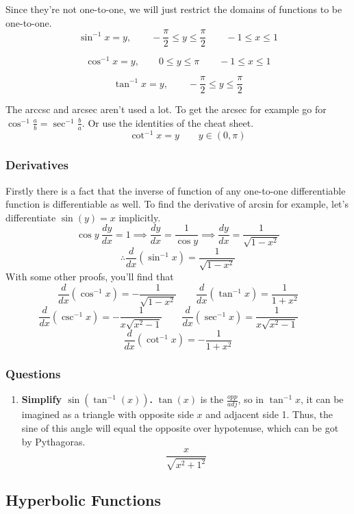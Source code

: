 \documentclass{article}
\begin{document}
Since they're not one-to-one, we will just restrict the domains of functions to be one-to-one.
\[
	\sin^{-1}x = y, \qquad - \frac{\pi}{2} \leq y \leq \frac{\pi}{2} \qquad -1 \leq x \leq 1
\]

\[
	\cos^{-1}x = y, \qquad  0 \leq y \leq \pi  \qquad -1 \leq x \leq 1
\]

\[
	\tan^{-1}x = y, \qquad - \frac{\pi}{2} \leq y \leq \frac{\pi}{2}
\]


The arccsc and arcsec aren't used a lot. To get the arcsec for example go for $\cos^{-1}\frac{a}{b} = \sec^{-1}{ \frac{b}{a} }$.
Or use the identities of the cheat sheet.
\[
	\qquad  \cot^{-1}x = y \qquad y \in (0,\pi) 
\]

\newpage

\subsubsection{Derivatives}
Firstly there is a fact that the inverse of function of any one-to-one differentiable function is differentiable as well.
To find the derivative of arcsin for example, let's differentiate $\sin(y)=x$ implicitly. \[
	\cos{y} \ \frac{dy}{dx} = 1 \implies \frac{dy}{dx} = \frac{1}{\cos{y}} \implies \frac{dy}{dx} = \frac{1}{\sqrt{1-x^2}}
\]
\[
	\therefore \frac{d}{dx}(\sin^{-1}x) = \frac{1}{\sqrt{1-x^2}}
\]
With some other proofs, you'll find that
\[
	\frac{d}{dx}(\cos^{-1}x) = - \frac{1}{\sqrt{1-x^2}}  \qquad 
	\frac{d}{dx}(\tan^{-1}x) = \frac{1}{1+x^2}	
\]
\[
	\frac{d}{dx}(\csc^{-1}x) = - \frac{1}{x \sqrt{x^2-1}}  \qquad 
	\frac{d}{dx}(\sec^{-1}x) =  \frac{1}{x \sqrt{x^2-1}}   \qquad 
\]
\[
	\frac{d}{dx}(\cot^{-1}x) = - \frac{1}{1+x^2}
\]

\subsubsection{Questions}

\begin{enumerate}[1.]
	\item \textbf{Simplify $ \sin(\tan^{-1}(x))$.}
		$\tan(x)$ is the $\frac{opp}{adj}$, so in $ \tan^{-1}x$, it can be imagined as a triangle with opposite side $x$ and adjacent side 1. Thus, the sine of this angle will equal the opposite over hypotenuse, which can be got by Pythagoras.
		\[
			\frac{x}{\sqrt{x^2+1^2}}
		\]

\end{enumerate}

\newpage

\subsection{Hyperbolic Functions}
\end{document}
